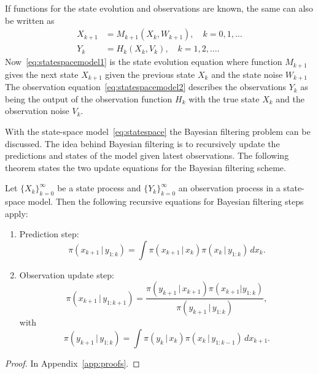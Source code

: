If functions for the state evolution and observations are known, the same can also be written as 
\begin{subequations}\label{eq:statespacemodel}
    \begin{align}
        X_{k+1} &= M_{k+1}(X_{k}, W_{k+1}), \quad k = 0,1,\dots \label{eq:statespacemodel1}\\
        Y_{k} &= H_{k}(X_{k}, V_{k}), \quad k = 1,2,\dots. \label{eq:statespacemodel2}
    \end{align}
\end{subequations}
Now~\eqref{eq:statespacemodel1} is the state evolution equation where function $M_{k+1}$ gives the next state $X_{k+1}$ given the previous state $X_{k}$ and the state noise $W_{k+1}$
The observation equation~\eqref{eq:statespacemodel2} describes the observations $Y_{k}$ as being the output of the observation function $H_{k}$ with the true state $X_{k}$ and the observation noise $V_{k}$.

With the state-space model~\eqref{eq:statespace} the Bayesian filtering problem can be discussed.
The idea behind Bayesian filtering is to recursively update the predictions and states of the model given latest observations.
The following theorem states the two update equations for the Bayesian filtering scheme.
\begin{theorem}\label{thm:updateformulas}
    Let $\{X_k\}_{k=0}^{\infty}$ be a state process and $\{Y_k\}_{k=0}^{\infty}$ an observation process in a state-space model.
    Then the following recursive equations for Bayesian filtering steps apply:
    \begin{enumerate}
        \item 
            Prediction step:
            \begin{equation}\label{eq:predictionstep}
                \pi (x_{k+1} \, \vert \, y_{1:k}) = \int \pi (x_{k+1} \, \vert \, x_k) \pi (x_k \, \vert \, y_{1:k}) \, d x_k.
            \end{equation}
        \item
            Observation update step:
            \begin{equation}\label{eq:updatestep}
                \pi(x_{k+1} \, \vert \, y_{1:k+1}) = \frac{\pi (y_{k+1} \, \vert \, x_{k+1}) \pi (x_{k+1} | y_{1:k})}{\pi (y_{k+1} \, \vert \, y_{1:k})},
            \end{equation}
            with
            \begin{equation*}
                \pi (y_{k+1} \, \vert \, y_{1:k}) = \int \pi (y_k \, \vert \, x_k) \pi (x_k \, \vert \, y_{1:k-1}) \, d x_{k+1}.
            \end{equation*}
    \end{enumerate}
\end{theorem}
\begin{proof}
    In Appendix~\ref{app:proofs}.
\end{proof}

